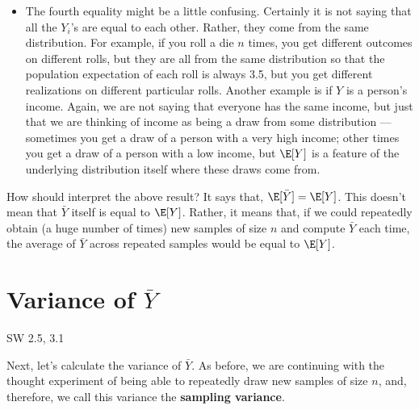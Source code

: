 \documentclass[
  letterpaper,
  DIV=11,
  numbers=noendperiod]{scrreprt}
\providecommand{\tightlist}{%
  \setlength{\itemsep}{0pt}\setlength{\parskip}{0pt}}\usepackage{longtable,booktabs,array}
\begin{document}
\begin{itemize}
\tightlist
\item
  The fourth equality might be a little confusing. Certainly it is not
  saying that all the \(Y_i\)'s are equal to each other. Rather, they
  come from the same distribution. For example, if you roll a die \(n\)
  times, you get different outcomes on different rolls, but they are all
  from the same distribution so that the population expectation of each
  roll is always 3.5, but you get different realizations on different
  particular rolls. Another example is if \(Y\) is a person's income.
  Again, we are not saying that everyone has the same income, but just
  that we are thinking of income as being a draw from some distribution
  --- sometimes you get a draw of a person with a very high income;
  other times you get a draw of a person with a low income, but
  \(\E[Y]\) is a feature of the underlying distribution itself where
  these draws come from.
\end{itemize}

How should interpret the above result? It says that,
\(\E[\bar{Y}] = \E[Y]\). This doesn't mean that \(\bar{Y}\) itself is
equal to \(\E[Y]\). Rather, it means that, if we could repeatedly obtain
(a huge number of times) new samples of size \(n\) and compute
\(\bar{Y}\) each time, the average of \(\bar{Y}\) across repeated
samples would be equal to \(\E[Y]\).

\section{\texorpdfstring{Variance of
\(\bar{Y}\)}{Variance of \textbackslash bar\{Y\}}}\label{variance-of-bary}

SW 2.5, 3.1

Next, let's calculate the variance of \(\bar{Y}\). As before, we are
continuing with the thought experiment of being able to repeatedly draw
new samples of size \(n\), and, therefore, we call this variance the
\textbf{sampling variance}.
\end{document}
